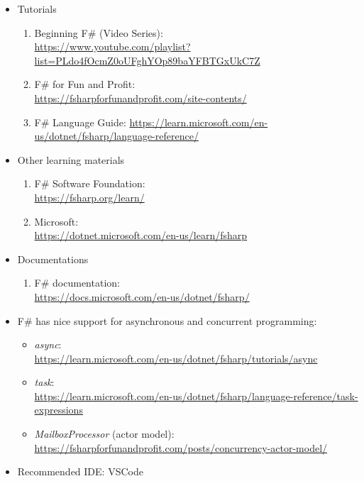 \documentclass{article}
\begin{document}
\begin{itemize}
    \begin{itemize}
        \item Tutorials
        \begin{enumerate}
            \item Beginning F\# (Video Series):\\
            \href{https://www.youtube.com/playlist?list=PLdo4fOcmZ0oUFghYOp89baYFBTGxUkC7Z}{https://www.youtube.com/playlist?list=PLdo4fOcmZ0oUFghYOp89baYFBTGxUkC7Z}
            \item F\# for Fun and Profit:\\
            \href{https://fsharpforfunandprofit.com/site-contents/}{https://fsharpforfunandprofit.com/site-contents/}
            \item F\# Language Guide:
            \href{https://learn.microsoft.com/en-us/dotnet/fsharp/language-reference/}{https://learn.microsoft.com/en-us/dotnet/fsharp/language-reference/}
        \end{enumerate}
        \item Other learning materials
        \begin{enumerate}
            \item F\# Software Foundation:\\
            \href{https://fsharp.org/learn/}{https://fsharp.org/learn/}
            \item Microsoft:\\
            \href{https://dotnet.microsoft.com/en-us/learn/fsharp}{https://dotnet.microsoft.com/en-us/learn/fsharp}
        \end{enumerate}
        \item Documentations
        \begin{enumerate}
            \item F\# documentation:\\
        \href{https://docs.microsoft.com/en-us/dotnet/fsharp/}{https://docs.microsoft.com/en-us/dotnet/fsharp/}
        \end{enumerate}
        \item F\# has nice support for asynchronous and concurrent programming:
        \begin{itemize}
            \item \emph{async}:\\
            \href{https://learn.microsoft.com/en-us/dotnet/fsharp/tutorials/async}{https://learn.microsoft.com/en-us/dotnet/fsharp/tutorials/async}
            \item \emph{task}:\\
            \href{https://learn.microsoft.com/en-us/dotnet/fsharp/language-reference/task-expressions}{https://learn.microsoft.com/en-us/dotnet/fsharp/language-reference/task-expressions}
            \item \emph{MailboxProcessor} (actor model):\\
            \href{https://fsharpforfunandprofit.com/posts/concurrency-actor-model/}{https://fsharpforfunandprofit.com/posts/concurrency-actor-model/}
        \end{itemize}
        \item Recommended IDE: VSCode
    \end{itemize}


\end{itemize}
\end{document}
